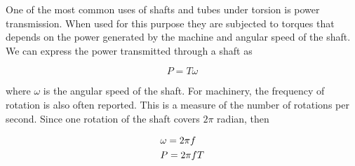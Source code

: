 \documentclass[
10pt,
a4paper,
openany,
svgnames,
]{book} %
\begin{document}
One of the most common uses of shafts and tubes under torsion is power transmission. When used for this purpose they are subjected to torques that depends on the power generated by the machine and angular speed of the shaft. We can express the power transmitted through a shaft as

\begin{equation}
  P = T\omega
\end{equation}

where $\omega$  is the angular speed of the shaft. For machinery, the frequency of rotation is also often reported. This is a measure of the number of rotations per second. Since one rotation of the shaft covers $2\pi$ radian, then

\begin{equation} \label{eqn: power-torque}
  \begin{gathered}
    \omega  = 2\pi f \hfill \\
    P = 2\pi fT \hfill \\ 
  \end{gathered}
\end{equation}
\end{document}
